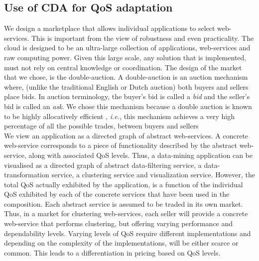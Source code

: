 \documentclass[10pt,journal,compsoc]{IEEEtran}
\begin{document}
\subsection{Use of CDA for QoS adaptation}
We design a marketplace that allows individual applications to select web-services. This is important from the view of robustness and even practicality. The cloud is designed to be an ultra-large collection of applications, web-services and raw computing power. Given this large scale, any solution that is implemented, must not rely on central knowledge or coordination. The design of the market that we chose, is the double-auction. A double-auction is an auction mechanism where, (unlike the traditional English or Dutch auction) both buyers and sellers place bids. In auction terminology, the buyer's bid is called a \textit{bid} and the seller's bid is called an \textit{ask}. We chose this mechanism because a double auction is known to be highly allocatively efficient \cite{Gode1993Allocative}, \textit{i.e.}, this mechanism achieves a very high percentage of all the possible trades, between buyers and sellers 
\\
We view an application as a directed graph of abstract web-services. A concrete web-service corresponds to a piece of functionality described by the abstract web-service, along with associated QoS levels. Thus, a data-mining application can be visualised as a directed graph of abstract data-filtering service, a data-transformation service, a clustering service and visualization service. However, the total QoS actually exhibited by the application, is a function of the individual QoS exhibited by each of the concrete services that have been used in the composition. Each abstract service is assumed to be traded in its own market. 
Thus, in a market for clustering web-services, each seller will provide a concrete web-service that performs clustering, but offering varying performance and dependability levels. Varying levels of QoS require different implementations and depending on the complexity of the implementations, will be either scarce or common. This leads to a differentiation in pricing based on QoS levels. 
\end{document}
